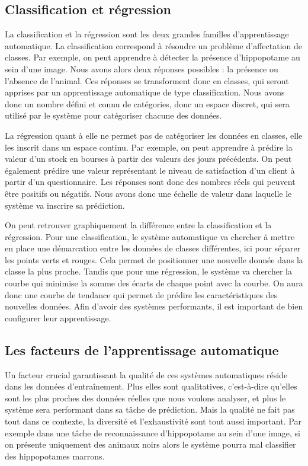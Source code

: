 \subsection{Classification et régression}
La classification et la régression sont les deux grandes familles d'apprentissage automatique.
La classification correspond à résoudre un problème d'affectation de classes. Par exemple, on peut apprendre à détecter la présence d'hippopotame au sein d'une image. Nous avons alors deux réponses possibles : la présence ou l'absence de l'animal. Ces réponses se transforment donc en classes, qui seront apprises par un apprentissage automatique de type classification. Nous avons donc un nombre défini et connu de catégories, donc un espace discret, qui sera utilisé par le système pour catégoriser chacune des données.

La régression quant à elle ne permet pas de catégoriser les données en classes, elle les inscrit dans un espace continu. Par exemple, on peut apprendre à  prédire la valeur d'un stock en bourses à partir des valeurs des jours précédents. On peut également prédire une valeur représentant le niveau de satisfaction d'un client à partir d'un questionnaire. Les réponses sont donc des nombres réels qui peuvent être positifs ou négatifs. Nous avons donc une échelle de valeur dans laquelle le système va inscrire sa prédiction.

%

On peut retrouver graphiquement la différence entre la classification et la régression. Pour une classification, le système automatique va chercher à mettre en place une démarcation entre les données de classes différentes, ici pour séparer les points verts et rouges. Cela permet de positionner une nouvelle donnée dans la classe la plus proche. Tandis que pour une régression, le système va chercher la courbe qui minimise la somme des écarts de chaque point avec la courbe. On aura donc une courbe de tendance qui permet de prédire les caractéristiques des nouvelles données.
Afin d'avoir des systèmes performants, il est important de bien configurer leur apprentissage.

\subsection{Les facteurs de l'apprentissage automatique}
Un facteur crucial garantissant la qualité de ces systèmes automatiques réside dans les données d’entraînement. Plus elles sont qualitatives, c'est-à-dire qu'elles sont les plus proches des données réelles que nous voulons analyser, et plus le système sera performant dans sa tâche de prédiction. Mais la qualité ne fait pas tout dans ce contexte, la diversité et l'exhaustivité sont tout aussi important. Par exemple dans une tâche de reconnaissance d'hippopotame au sein d'une image, si on présente uniquement des animaux noirs alors le système pourra mal classifier des hippopotames marrons.

